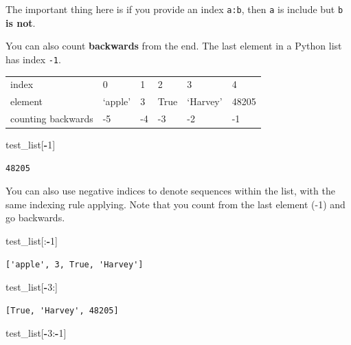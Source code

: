 \documentclass[
  letterpaper,
]{scrbook}
\newenvironment{Shaded}{\begin{snugshade}}{\end{snugshade}}
\newcommand{\DecValTok}[1]{\textcolor[rgb]{0.00,0.00,0.81}{#1}}
\newcommand{\NormalTok}[1]{#1}
\newcommand{\OperatorTok}[1]{\textcolor[rgb]{0.81,0.36,0.00}{\textbf{#1}}}
\begin{document}
The important thing here is if you provide an index \texttt{a:b}, then \texttt{a} is include but \texttt{b} \textbf{is not}.

You can also count \textbf{backwards} from the end. The last element in a Python list has index \texttt{-1}.

\begin{longtable}[]{@{}llllll@{}}
\toprule
\endhead
index & 0 & 1 & 2 & 3 & 4\tabularnewline
element & `apple' & 3 & True & `Harvey' & 48205\tabularnewline
counting backwards & -5 & -4 & -3 & -2 & -1\tabularnewline
\bottomrule
\end{longtable}

\begin{Shaded}
\begin{Highlighting}[]
\NormalTok{test_list[}\OperatorTok{-}\DecValTok{1}\NormalTok{]}
\end{Highlighting}
\end{Shaded}

\begin{verbatim}
48205
\end{verbatim}

You can also use negative indices to denote sequences within the list, with the same indexing rule applying. Note that you count from the last element (-1) and go backwards.

\begin{Shaded}
\begin{Highlighting}[]
\NormalTok{test_list[:}\OperatorTok{-}\DecValTok{1}\NormalTok{]}
\end{Highlighting}
\end{Shaded}

\begin{verbatim}
['apple', 3, True, 'Harvey']
\end{verbatim}

\begin{Shaded}
\begin{Highlighting}[]
\NormalTok{test_list[}\OperatorTok{-}\DecValTok{3}\NormalTok{:]}
\end{Highlighting}
\end{Shaded}

\begin{verbatim}
[True, 'Harvey', 48205]
\end{verbatim}

\begin{Shaded}
\begin{Highlighting}[]
\NormalTok{test_list[}\OperatorTok{-}\DecValTok{3}\NormalTok{:}\OperatorTok{-}\DecValTok{1}\NormalTok{]}
\end{Highlighting}
\end{Shaded}
\end{document}
